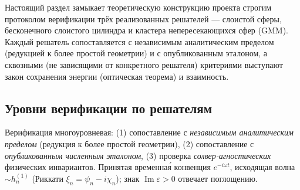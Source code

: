 \documentclass[11pt,a4paper]{article}
\begin{document}
Настоящий раздел замыкает теоретическую конструкцию проекта строгим протоколом верификации трёх реализованных решателей --- слоистой сферы, бесконечного слоистого цилиндра и кластера непересекающихся сфер (GMM). Каждый решатель сопоставляется с независимым аналитическим пределом (редукцией к более простой геометрии) и с опубликованным эталоном, а сквозными (не зависящими от конкретного решателя) критериями выступают закон сохранения энергии (оптическая теорема) и взаимность.

\subsection{Уровни верификации по решателям}
\label{decomp-ssec:verify}

Верификация многоуровневая: (1) сопоставление с \emph{независимым аналитическим пределом} (редукция к более простой геометрии), (2) сопоставление с \emph{опубликованным численным эталоном}, (3) проверка \emph{солвер-агностических} физических инвариантов. Принятая временна\'я конвенция $e^{-i\omega t}$, исходящая волна $\sim h_n^{(1)}$ (Риккати $\xi_n=\psi_n-i\chi_n$); знак $\operatorname{Im}\varepsilon>0$ отвечает поглощению.
\end{document}
